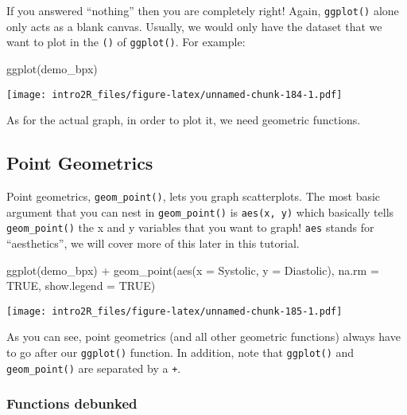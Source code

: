 \documentclass[
]{book}
\newenvironment{Shaded}{\begin{snugshade}}{\end{snugshade}}
\newcommand{\AttributeTok}[1]{\textcolor[rgb]{0.77,0.63,0.00}{#1}}
\newcommand{\ConstantTok}[1]{\textcolor[rgb]{0.00,0.00,0.00}{#1}}
\newcommand{\FunctionTok}[1]{\textcolor[rgb]{0.00,0.00,0.00}{#1}}
\newcommand{\NormalTok}[1]{#1}
\newcommand{\SpecialCharTok}[1]{\textcolor[rgb]{0.00,0.00,0.00}{#1}}
\begin{document}
If you answered ``nothing'' then you are completely right! Again, \texttt{ggplot()} alone only acts as a blank canvas. Usually, we would only have the dataset that we want to plot in the \texttt{()} of \texttt{ggplot()}. For example:

\begin{Shaded}
\begin{Highlighting}[]
\FunctionTok{ggplot}\NormalTok{(demo\_bpx)}
\end{Highlighting}
\end{Shaded}

\texttt{[image: intro2R\_files/figure-latex/unnamed-chunk-184-1.pdf]}

As for the actual graph, in order to plot it, we need geometric functions.

\hypertarget{point-geometrics}{%
\subsection{Point Geometrics}\label{point-geometrics}}

Point geometrics, \texttt{geom\_point()}, lets you graph scatterplots. The most basic argument that you can nest in \texttt{geom\_point()} is \texttt{aes(x,\ y)} which basically tells \texttt{geom\_point()} the x and y variables that you want to graph! \texttt{aes} stands for ``aesthetics'', we will cover more of this later in this tutorial.

\begin{Shaded}
\begin{Highlighting}[]
\FunctionTok{ggplot}\NormalTok{(demo\_bpx) }\SpecialCharTok{+} 
    \FunctionTok{geom\_point}\NormalTok{(}\FunctionTok{aes}\NormalTok{(}\AttributeTok{x =}\NormalTok{ Systolic, }
                   \AttributeTok{y =}\NormalTok{ Diastolic), }
               \AttributeTok{na.rm =} \ConstantTok{TRUE}\NormalTok{,}
               \AttributeTok{show.legend =} \ConstantTok{TRUE}\NormalTok{) }
\end{Highlighting}
\end{Shaded}

\texttt{[image: intro2R\_files/figure-latex/unnamed-chunk-185-1.pdf]}

As you can see, point geometrics (and all other geometric functions) always have to go after our \texttt{ggplot()} function. In addition, note that \texttt{ggplot()} and \texttt{geom\_point()} are separated by a \texttt{+}.

\hypertarget{functions-debunked-18}{%
\subsubsection{Functions debunked}\label{functions-debunked-18}}
\end{document}
